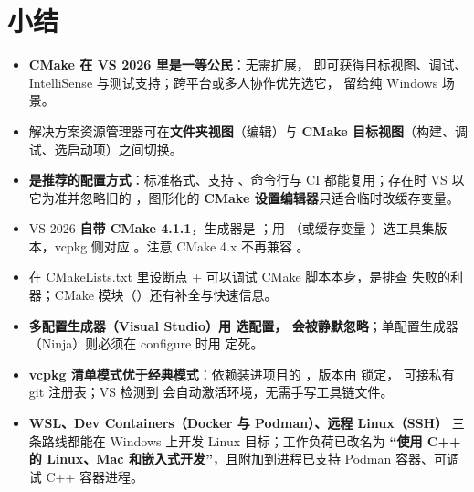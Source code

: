 {\section{小结}
\begin{itemize}
  \item \textbf{CMake 在 VS 2026 里是一等公民}：无需扩展， 即可获得目标视图、调试、IntelliSense 与测试支持；跨平台或多人协作优先选它， 留给纯 Windows 场景。
  \item 解决方案资源管理器可在\textbf{文件夹视图}（编辑）与 \textbf{CMake 目标视图}（构建、调试、选启动项）之间切换。
  \item \textbf{ 是推荐的配置方式}：标准格式、支持 、命令行与 CI 都能复用；存在时 VS 以它为准并忽略旧的 ，图形化的 \textbf{CMake 设置编辑器}只适合临时改缓存变量。
  \item VS 2026 \textbf{自带 CMake 4.1.1}，生成器是 \textbf{}；用 \textbf{}（或缓存变量 ）选工具集版本，vcpkg 侧对应 。注意 CMake 4.x 不再兼容 。
  \item 在 CMakeLists.txt 里设断点 +  可以调试 CMake 脚本本身，是排查  失败的利器；CMake 模块（）还有补全与快速信息。
  \item \textbf{多配置生成器（Visual Studio）用  选配置， 会被静默忽略}；单配置生成器（Ninja）则必须在 configure 时用  定死。
  \item \textbf{vcpkg 清单模式优于经典模式}：依赖装进项目的 ，版本由  锁定， 可接私有 git 注册表；VS 检测到  会自动激活环境，无需手写工具链文件。
  \item \textbf{WSL、Dev Containers（Docker 与 Podman）、远程 Linux（SSH）} 三条路线都能在 Windows 上开发 Linux 目标；工作负荷已改名为 \textbf{“使用 C++ 的 Linux、Mac 和嵌入式开发”}，且附加到进程已支持 Podman 容器、可调试 C++ 容器进程。
\end{itemize}
}
